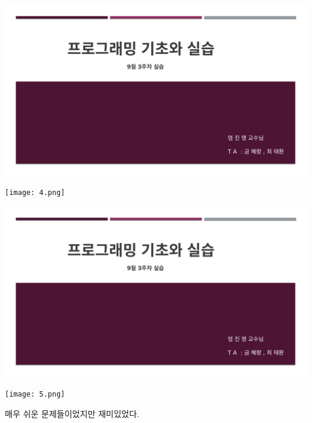 \documentclass[11pt,a4paper]{article}
\begin{document}
\begin{enumerate}
\includegraphics[page=5, width=\textwidth]{1.pdf}
	
\texttt{[image: 4.png]}	


\includegraphics[page=6, width=\textwidth]{1.pdf}
	
\texttt{[image: 5.png]}	


\end{enumerate}

{}
\indent
매우 쉬운 문제들이었지만 재미있었다.
\end{document}
